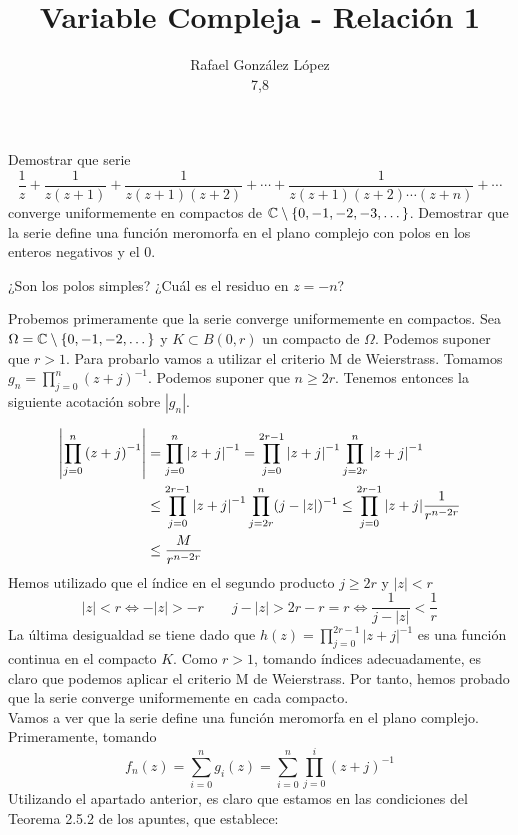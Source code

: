 \documentclass[twoside]{article}
\begin{document}
\title{Variable Compleja - Relación 1}
\author{Rafael González López\\
7,8}
\maketitle
\begin{ejercicio}{1}
Demostrar que serie 
$$
\frac{1}{z}+\frac{1}{z(z+1)}+\frac{1}{z(z+1)(z+2)}+\cdots + \frac{1}{z(z+1)(z+2)\cdots  (z+n)}+\cdots$$
converge uniformemente en compactos de $\mathbb{C}\setminus\{0,-1,-2,-3,\dotsc\}$. Demostrar que la serie define una función meromorfa en el plano complejo con polos en los enteros negativos y el $0$.

¿Son los polos simples? ¿Cuál es el residuo en $z=-n$?
\begin{solucion}
Probemos primeramente que la serie converge uniformemente en compactos. Sea $\Omega = \mathbb{C}\setminus\{0,-1,-2,\dotsc\}$ y $K\subset B(0,r)$ un compacto de $\Omega$. Podemos suponer que $r>1$. Para probarlo vamos a utilizar el criterio M de Weierstrass. Tomamos $g_n = \prod_{j=0}^n \left(z+j\right)^{-1}$. Podemos suponer que $n\geq 2r$.  Tenemos entonces la siguiente acotación sobre $|g_n|$.

\begin{align*}
\left\lvert\prod_{j=0}^n \left(z+j\right)^{-1}\right\rvert &= \prod_{j=0}^n \left|z+j\right|^{-1} =  \prod_{j=0}^{2r-1}\left|z+j\right|^{-1}  \prod_{j=2r}^n \left|z+j\right|^{-1}\\
&\leq  \prod_{j=0}^{2r-1}\left|z+j\right|^{-1}  \prod_{j=2r}^n (j-|z|)^{-1} \leq \prod_{j=0}^{2r-1}|z+j|\frac{1}{r^{n-2r}}\\
& \leq \frac{M}{r^{n-2r}}
\end{align*}
Hemos utilizado que el índice en el segundo producto $j\geq 2r$ y $|z|<r$
$$
|z|<r \Leftrightarrow -|z|>-r \qquad j-|z|> 2r-r = r \Leftrightarrow \frac{1}{j-|z|}< \frac{1}{r}
$$
\newpage
La última desigualdad se tiene dado que $h(z)=\prod_{j=0}^{2r-1}|z+j|^{-1}$ es una función continua en el compacto $K$. Como $r>1$, tomando índices adecuadamente, es claro que podemos aplicar el criterio M de Weierstrass. Por tanto, hemos probado que la serie converge uniformemente en cada compacto.\\

Vamos a ver que la serie define una función meromorfa en el plano complejo. Primeramente, tomando 
$$
 f_n(z) = \sum_{i=0}^n g_i(z) = \sum_{i=0}^n \prod_{j=0}^i (z+j)^{-1}
$$
Utilizando el apartado anterior, es claro que estamos en las condiciones del Teorema 2.5.2 de los apuntes, que establece:


\end{solucion}
\end{ejercicio}
\end{document}
